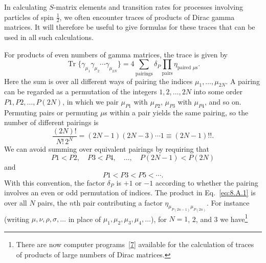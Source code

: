 

In calculating $S$-matrix elements and transition rates for processes
involving particles of spin $\tfrac12$, we often encounter traces of products
of Dirac gamma matrices. It will therefore be useful to give formulas for
these traces that can be used in all such calculations.

For products of even numbers of gamma matrices, the trace is given by
\begin{equation}
\operatorname{Tr}\{\gamma_{\mu_1}\gamma_{\mu_2}\cdots\gamma_{\mu_{2N}}\}
=4\sum_{\text{pairings}}\delta_P
\prod_{\text{pairs}}\eta_{\text{paired }\mu\text{s}}.
\tag{8.A.1}\label{eq:8.A.1}
\end{equation}
Here the sum is over all different ways of pairing the indices
$\mu_1,\ldots,\mu_{2N}$. A pairing can be regarded as a permutation of the
integers $1,2,\ldots,2N$ into some order $P1,P2,\ldots,P(2N)$,
in which we pair $\mu_{P1}$ with $\mu_{P2}$, $\mu_{P3}$ with $\mu_{P4}$, and
so on. Permuting pairs or permuting $\mu$s within a pair yields the same
pairing, so the number of different pairings is
\begin{equation}
\frac{(2N)!}{N!\,2^N}=(2N-1)(2N-3)\cdots1\equiv(2N-1)!!.
\tag{8.A.2}\label{eq:8.A.2}
\end{equation}
We can avoid summing over equivalent pairings by requiring that
\begin{equation}
P1<P2,\quad P3<P4,\quad\ldots,\quad
P(2N-1)<P(2N)
\tag{8.A.3}\label{eq:8.A.3}
\end{equation}
and
\begin{equation}
P1<P3<P5<\cdots.
\tag{8.A.4}\label{eq:8.A.4}
\end{equation}
With this convention, the factor $\delta_P$ is $+1$ or $-1$ according to
whether the pairing involves an even or odd permutation of indices. The
product in Eq.~\eqref{eq:8.A.1} is over all $N$ pairs, the $n$th pair contributing a
factor $\eta_{\mu_{P(2n-1)}\mu_{P(2n)}}$. For instance (writing
$\mu,\nu,\rho,\sigma,\ldots$ in place of
$\mu_1,\mu_2,\mu_3,\mu_4,\ldots$), for $N=1$, 2, and 3 we have\footnote{There
are now computer programs~\hyperref[ref:8.7]{[7]} available for the calculation of traces of
products of large numbers of Dirac matrices.}
